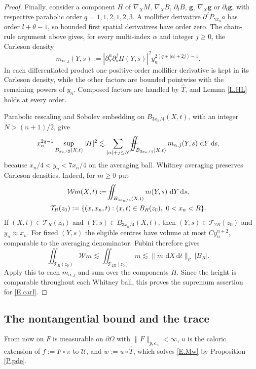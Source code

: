 \documentclass[10pt,a4paper]{amsart}
\numberwithin{equation}{section}
\newcommand{\pom}{\partial\Omega}
\newcommand{\pd}{\partial}
\newcommand{\Uc}{\mathcal U}
\newcommand{\Cc}{\mathcal C}
\renewcommand{\d}{\,\mathrm d}
\newcommand{\Cnorm}[1]{\|#1\|_{\Cc}}
\def\Yint#1{\mathchoice
	{\YYint\displaystyle\textstyle{#1}}%
	{\YYint\textstyle\scriptstyle{#1}}%
	{\YYint\scriptstyle\scriptscriptstyle{#1}}%
	{\YYint\scriptscriptstyle\scriptscriptstyle{#1}}%
	\!\dint}
\newcommand{\dint}{\int\!\!\!\!\!\int}
\def\YYint#1#2#3{{\setbox0=\hbox{$#1{#2#3}{\iint}$}
		\vcenter{\hbox{$#2#3$}}\kern-.51\wd0}}
\def\longdash{\mkern-1.5mu{-}\mkern-7.5mu{-}}
\def\fiint{\Yint\longdash}
\begin{document}
\begin{proof}
Finally, consider a component $H$ of
$\nabla_XM$, $\nabla_XB$, $\pd_tB$, $\mathbf g$,
$\nabla_X\mathbf g$ or $\pd_t\mathbf g$, with respective parabolic order
$q=1,1,2,1,2,3$. A mollifier derivative
$\pd^{\,l}P_{\gamma x_n}a$ has order $l+\theta-1$, so bounded first
spatial derivatives have order zero. The chain-rule argument above gives,
for every multi-index $\alpha$ and integer $j\ge0$, the Carleson density
\[
 m_{\alpha,j}(Y,s):=
 |\pd_Y^\alpha\pd_s^jH(Y,s)|^2y_n^{2(q+|\alpha|+2j)-1}.
\]
In each differentiated product one positive-order mollifier derivative is
kept in its Carleson density, while the other factors are bounded pointwise
with the remaining powers of $y_n$. Composed factors are handled by
$\widehat T$, and Lemma \ref{L.HL} holds at every order.\medskip

\noindent Parabolic rescaling and Sobolev embedding on
$B_{3x_n/4}(X,t)$, with an integer $N>(n+1)/2$, give
\[
 x_n^{2q-1}\sup_{B_{x_n/2}(X,t)}|H|^2
 \lesssim\sum_{|\alpha|+j\le N}
       \fiint_{B_{3x_n/4}(X,t)}m_{\alpha,j}(Y,s)\,\d Y\d s,
\]
because $x_n/4<y_n<7x_n/4$ on the averaging ball.
Whitney averaging preserves Carleson densities. Indeed, for $m\ge0$ put
\[
 \begin{gathered}
 \mathcal Wm(X,t):=\fiint_{B_{3x_n/4}(X,t)}m(Y,s)\,\d Y\d s,\\
 \mathcal T_R(z_0):=\{(x,x_n,t):(x,t)\in B_R(z_0),\ 0<x_n<R\}.
 \end{gathered}
\]
If $(X,t)\in\mathcal T_R(z_0)$ and $(Y,s)\in B_{3x_n/4}(X,t)$, then
$(Y,s)\in\mathcal T_{2R}(z_0)$ and $y_n\approx x_n$. For fixed $(Y,s)$
the eligible centres have volume at most $Cy_n^{n+2}$, comparable to the
averaging denominator. Fubini therefore gives
\[
 \iint_{\mathcal T_R(z_0)}\mathcal Wm
 \lesssim\iint_{\mathcal T_{2R}(z_0)}m
 \lesssim\Cnorm{m\,\d X\d t}\,|B_R|.
\]
Apply this to each $m_{\alpha,j}$ and sum over the components $H$.
Since the height is comparable throughout each Whitney ball, this proves
the supremum assertion for \eqref{E.carl}.
\end{proof}

\subsection{The nontangential bound and the trace}\label{ss.trace}

From now on $F$ is measurable on $\pom$ with $\|F\|_{p,e_n}<\infty$, $u$ is the
caloric extension of $f:=F\circ\pi$ to $\Uc$, and $w:=u\circ\widehat T$, which
solves \eqref{E.Mw} by Proposition \ref{P.pde}.
\end{document}

